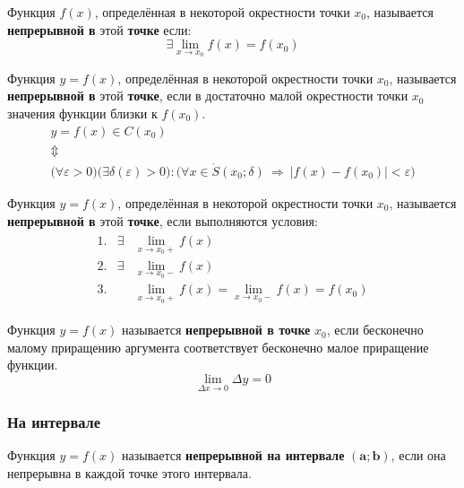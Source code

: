 \begin{definition}
  Функция $f(x)$, определённая в некоторой окрестности точки $x_0$, называется \textbf{непрерывной в} этой \textbf{точке} если: \[
    \exists \lim_{x \to x_0} f(x) = f(x_0)
  \]
\end{definition}

\begin{definition}
  Функция $y = f(x)$, определённая в некоторой окрестности точки $x_0$, называется \textbf{непрерывной в} этой \textbf{точке}, если в достаточно малой окрестности точки $x_0$ значения функции близки к $f(x_0)$.
  \begin{gather*}
    y = f(x) \in C(x_0) \\
    \Updownarrow \\
    \big(\forall  \varepsilon > 0\big)\big(\exists \delta(\varepsilon) > 0\big)\colon\big(\forall x \in \mathring{S}(x_0; \delta)\ \Rightarrow\ |f(x) - f(x_0)| < \varepsilon\big)  
  \end{gather*}
\end{definition}

\begin{definition}
  Функция $y = f(x)$, определённая в некоторой окрестности точки $x_0$, называется \textbf{непрерывной в} этой \textbf{точке}, если выполняются условия:
  \begin{gather*}
    \begin{array}{rrl}
      1. & \exists &\lim\limits_{x \to x_0+} f(x) \\[2ex]
      2. & \exists &\lim\limits_{x \to x_0-} f(x) \\[2ex]
      3. &  &\lim\limits_{x \to x_0+} f(x) = \lim\limits_{x \to x_0-} f(x) = f(x_0) 
    \end{array}
  \end{gather*}
\end{definition}

\begin{definition}
  Функция $y = f(x)$ называется \textbf{непрерывной в точке} $x_0$, если бесконечно малому приращению аргумента соответствует бесконечно малое приращение функции. \[ \lim_{\Delta x \to 0} \Delta y = 0 \] 
\end{definition}

\subsubsection{На интервале}

\begin{definition}
  Функция $y = f(x)$ называется \textbf{непрерывной на интервале} $\bm{(a; b)}$, если она непрерывна в каждой точке этого интервала.
\end{definition}

